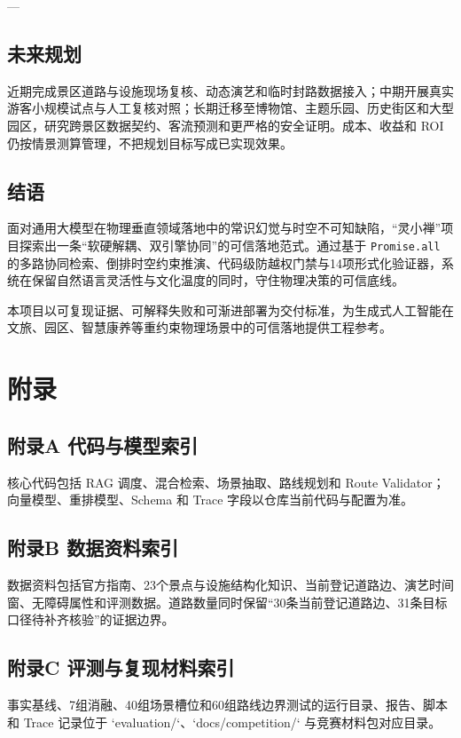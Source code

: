 \documentclass[11pt,a4paper]{ctexart}
\begin{document}
---

\subsection{未来规划}
近期完成景区道路与设施现场复核、动态演艺和临时封路数据接入；中期开展真实游客小规模试点与人工复核对照；长期迁移至博物馆、主题乐园、历史街区和大型园区，研究跨景区数据契约、客流预测和更严格的安全证明。成本、收益和 ROI 仍按情景测算管理，不把规划目标写成已实现效果。

\subsection{结语}

面对通用大模型在物理垂直领域落地中的常识幻觉与时空不可知缺陷，“灵小禅”项目探索出一条“软硬解耦、双引擎协同”的可信落地范式。通过基于 \texttt{Promise.all} 的多路协同检索、倒排时空约束推演、代码级防越权门禁与14项形式化验证器，系统在保留自然语言灵活性与文化温度的同时，守住物理决策的可信底线。

本项目以可复现证据、可解释失败和可渐进部署为交付标准，为生成式人工智能在文旅、园区、智慧康养等重约束物理场景中的可信落地提供工程参考。

\section{附录}

\subsection{附录A 代码与模型索引}
核心代码包括 RAG 调度、混合检索、场景抽取、路线规划和 Route Validator；向量模型、重排模型、Schema 和 Trace 字段以仓库当前代码与配置为准。

\subsection{附录B 数据资料索引}
数据资料包括官方指南、23个景点与设施结构化知识、当前登记道路边、演艺时间窗、无障碍属性和评测数据。道路数量同时保留“30条当前登记道路边、31条目标口径待补齐核验”的证据边界。

\subsection{附录C 评测与复现材料索引}
事实基线、7组消融、40组场景槽位和60组路线边界测试的运行目录、报告、脚本和 Trace 记录位于 `evaluation/`、`docs/competition/` 与竞赛材料包对应目录。
\end{document}
